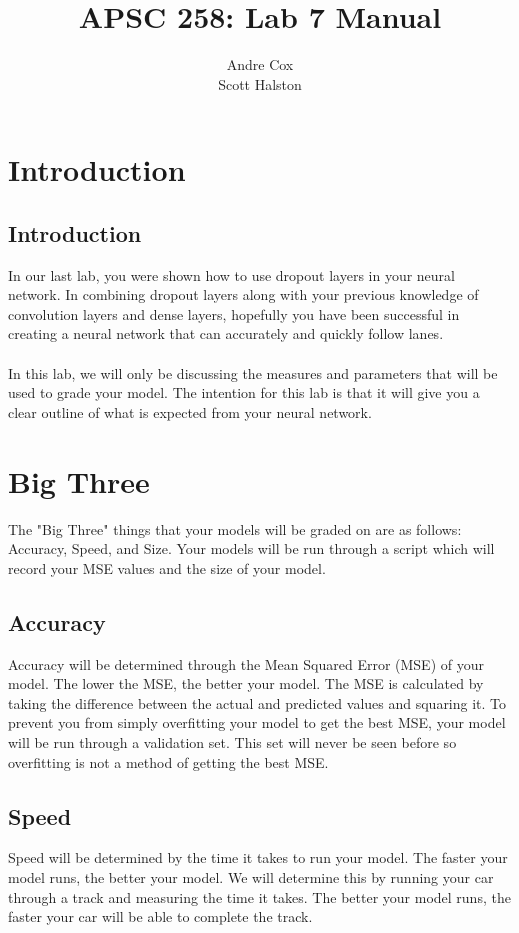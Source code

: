 \documentclass[11pt]{report}
\title{APSC 258: Lab 7 Manual}
\author{Andre Cox \\ Scott Halston}
\begin{document}
\maketitle
\tableofcontents

\clearpage

\chapter{Introduction}
\section{Introduction}
In our last lab, you were shown how to use dropout layers in your neural network. In combining dropout layers along with your previous knowledge of convolution layers and dense layers, hopefully you have been successful in creating a neural network that can accurately and quickly follow lanes.
\\ \\
In this lab, we will only be discussing the measures and parameters that will be used to grade your model. The intention for this lab is that it will give you a clear outline of what is expected from your neural network.

\chapter{Big Three}
The "Big Three" things that your models will be graded on are as follows:
    Accuracy, Speed, and Size.
Your models will be run through a script which will record your MSE values and the size of your model.

\section{Accuracy}
Accuracy will be determined through the Mean Squared Error (MSE) of your model. The lower the MSE, the better your model. The MSE is calculated by taking the difference between the actual and predicted values and squaring it. To prevent you from simply overfitting your model to get the best MSE, your model will be run through a validation set. This set will never be seen before so overfitting is not a method of getting the best MSE.

\section{Speed}
Speed will be determined by the time it takes to run your model. The faster your model runs, the better your model. We will determine this by running your car through a track and measuring the time it takes. The better your model runs, the faster your car will be able to complete the track.
\end{document}
